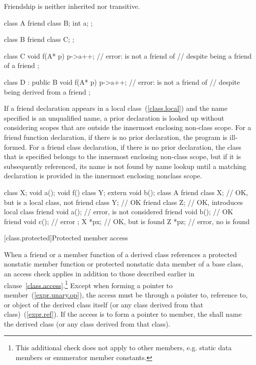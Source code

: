 \pnum
{}%
Friendship is neither inherited nor transitive.
\enterexample

\begin{codeblock}
class A {
    friend class B;
    int a;
};

class B {
    friend class C;
};

class C  {
    void f(A* p)
    {
	p->a++;			// error:  is not a friend of 
				// despite being a friend of a friend
    }
};

class D : public B  {
    void f(A* p)
    {
	p->a++;			// error:  is not a friend of 
				// despite being derived from a friend
    }
};
\end{codeblock}
\exitexampleb

\pnum
{}%
%
If a friend declaration appears in a local class~(\ref{class.local}) and the
name specified is an unqualified name, a prior declaration is looked
up without considering scopes that are outside the innermost enclosing
non-class scope.
For a friend function declaration, if there is no
prior declaration, the program is ill-formed.
For a friend class
declaration, if there is no prior declaration, the class that is
specified belongs to the innermost enclosing non-class scope, but if it is
subsequently referenced, its name is not found by name lookup
until a matching declaration is provided in the innermost enclosing
nonclass scope.
\enterexample

\begin{codeblock}
class X;
void a();
void f() {
    class Y;
    extern void b();
    class A {
	friend class X;		// OK, but  is a local class, not 
	friend class Y;		// OK
	friend class Z;		// OK, introduces local class 
	friend void a();	// error,  is not considered
	friend void b();	// OK
	friend void c();	// error
    };
    X *px;			// OK, but  is found
    Z *pz;			// error, no  is found
}
\end{codeblock}
\exitexampleb

[class.protected]{Protected member access}
%

\pnum
When a friend or a member function of a derived class references a protected
nonstatic member function or protected nonstatic data member of a base class,
an access check applies in addition to those described earlier in
clause~\ref{class.access}.\footnote{This additional check does not apply to
other members, e.g. static data members or enumerator member constants.}
Except when forming a pointer to member~(\ref{expr.unary.op}), the access
must be through a pointer to, reference to, or object of the derived class
itself (or any class derived from that class)~(\ref{expr.ref}). If the access
is to form a pointer to member, the  shall
name the derived class (or any class derived from that class).
\enterexample


